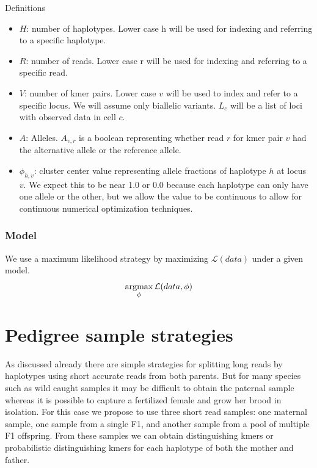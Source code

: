 Definitions
\begin{itemize}
\item $H$: number of haplotypes. Lower case h will be used for indexing and referring to a specific haplotype.
\item $R$: number of reads. Lower case r will be used for indexing and referring to a specific read. 
\item $V$: number of kmer pairs. Lower case $v$ will be used to index and refer to a specific locus. We will assume only biallelic variants. $L_c$ will be a list of loci with observed data in cell $c$.
\item $A$: Alleles. $A_{v,r}$ is a boolean representing whether read $r$ for kmer pair $v$ had the alternative allele or the reference allele.
\item $\phi_{h,v}$: cluster center value representing allele fractions of haplotype $h$ at locus $v$. We expect this to be near 1.0 or 0.0 because each haplotype can only have one allele or the other, but we allow the value to be continuous to allow for continuous numerical optimization techniques.
\end{itemize}

\noindent
\subsubsection{Model}

We use a maximum likelihood strategy by maximizing $\mathcal{L}(data)$ under a given model. 
\begin{equation}
\operatorname*{argmax}_{\phi} \mathcal{L}(data, \phi)
\end{equation}


\section{Pedigree sample strategies}
As discussed already there are simple strategies for splitting long reads by haplotypes using short accurate reads from both parents. 
But for many species such as wild caught samples it may be difficult to obtain the paternal sample whereas it is possible to capture a 
fertilized female and grow her brood in isolation. For this case we propose to use three short read samples: one maternal sample, one sample 
from a single F1, and another sample from a pool of multiple F1 offspring. From these samples we can obtain distinguishing kmers or probabilistic 
distinguishing kmers for each haplotype of both the mother and father.

